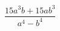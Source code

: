\begin{ex}[type=expression]
	\begin{condition}
		\(\dfrac{15a^3b+15ab^3}{a^4-b^4}\)
	\end{condition}
\end{ex}